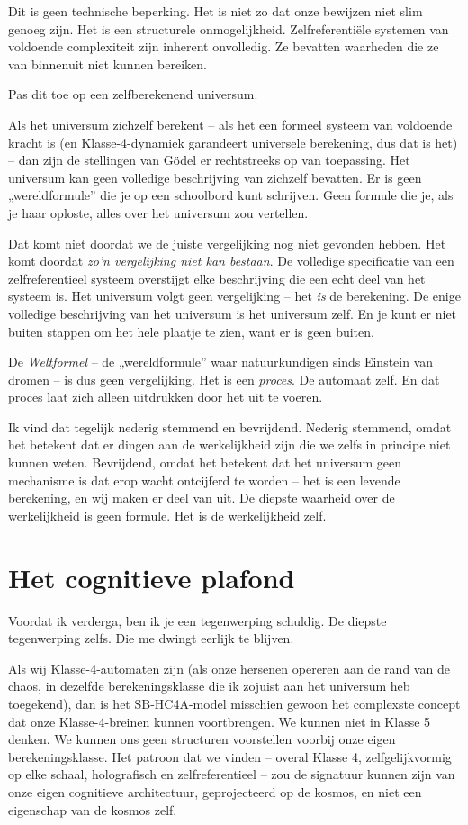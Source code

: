 \documentclass[11pt, twoside, openright]{book}
\begin{document}
Dit is geen technische beperking. Het is niet zo dat onze bewijzen niet slim genoeg zijn. Het is een structurele onmogelijkheid. Zelfreferentiële systemen van voldoende complexiteit zijn inherent onvolledig. Ze bevatten waarheden die ze van binnenuit niet kunnen bereiken.

Pas dit toe op een zelfberekenend universum.

Als het universum zichzelf berekent -- als het een formeel systeem van voldoende kracht is (en Klasse-4-dynamiek garandeert universele berekening, dus dat is het) -- dan zijn de stellingen van Gödel er rechtstreeks op van toepassing. Het universum kan geen volledige beschrijving van zichzelf bevatten. Er is geen „wereldformule” die je op een schoolbord kunt schrijven. Geen formule die je, als je haar oploste, alles over het universum zou vertellen.

Dat komt niet doordat we de juiste vergelijking nog niet gevonden hebben. Het komt doordat \textit{zo'n vergelijking niet kan bestaan}. De volledige specificatie van een zelfreferentieel systeem overstijgt elke beschrijving die een echt deel van het systeem is. Het universum volgt geen vergelijking -- het \textit{is} de berekening. De enige volledige beschrijving van het universum is het universum zelf. En je kunt er niet buiten stappen om het hele plaatje te zien, want er is geen buiten.

De \textit{Weltformel} -- de „wereldformule” waar natuurkundigen sinds Einstein van dromen -- is dus geen vergelijking. Het is een \textit{proces}. De automaat zelf. En dat proces laat zich alleen uitdrukken door het uit te voeren.

Ik vind dat tegelijk nederig stemmend en bevrijdend. Nederig stemmend, omdat het betekent dat er dingen aan de werkelijkheid zijn die we zelfs in principe niet kunnen weten. Bevrijdend, omdat het betekent dat het universum geen mechanisme is dat erop wacht ontcijferd te worden -- het is een levende berekening, en wij maken er deel van uit. De diepste waarheid over de werkelijkheid is geen formule. Het is de werkelijkheid zelf.


\section*{Het cognitieve plafond}

Voordat ik verderga, ben ik je een tegenwerping schuldig. De diepste tegenwerping zelfs. Die me dwingt eerlijk te blijven.

Als wij Klasse-4-automaten zijn (als onze hersenen opereren aan de rand van de chaos, in dezelfde berekeningsklasse die ik zojuist aan het universum heb toegekend), dan is het SB-HC4A-model misschien gewoon het complexste concept dat onze Klasse-4-breinen kunnen voortbrengen. We kunnen niet in Klasse 5 denken. We kunnen ons geen structuren voorstellen voorbij onze eigen berekeningsklasse. Het patroon dat we vinden -- overal Klasse 4, zelfgelijkvormig op elke schaal, holografisch en zelfreferentieel -- zou de signatuur kunnen zijn van onze eigen cognitieve architectuur, geprojecteerd op de kosmos, en niet een eigenschap van de kosmos zelf.
\end{document}
